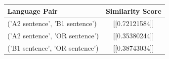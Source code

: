 \begin{tabular}{|l|c|}
\hline
Language Pair & Similarity Score \\
\hline
('A2 sentence', 'B1 sentence') & [[0.72121584]] \\
('A2 sentence', 'OR sentence') & [[0.35380244]] \\
('B1 sentence', 'OR sentence') & [[0.38743034]] \\
\hline
\end{tabular}

